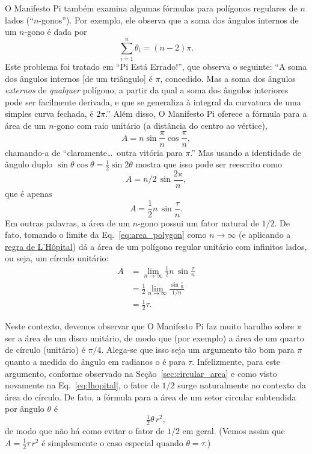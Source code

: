 O Manifesto Pi também examina algumas fórmulas para polígonos regulares de $n$ lados (``$n$-gonos''). Por exemplo, ele observa que a soma dos ângulos internos de um $n$-gono é dada por
\[
\sum_{i=1}^n \theta_i=(n-2)\pi.
\]
Este problema foi tratado em ``Pi Está Errado!'', que observa o seguinte: ``A soma dos ângulos internos [de um triângulo] é $\pi$, concedido. Mas a soma dos ângulos \emph{externos} de \emph{qualquer} polígono, a partir da qual a soma dos ângulos interiores pode ser facilmente derivada, e que se generaliza à integral da curvatura de uma simples curva fechada, é $2\pi$.'' Além disso, O Manifesto Pi oferece a fórmula para a área de um $n$-gono com raio unitário (a distância do centro ao vértice),
\[ A=n\sin\frac{\pi}{n}\cos\frac{\pi}{n}, \]
chamando-a de ``claramente\ldots\ outra vitória para $\pi$.'' Mas usando a identidade de ângulo duplo $\sin\theta\cos\theta = \frac{1}{2} \sin 2\theta$ mostra que isso pode ser reescrito como
\[ A = n/2\, \sin\frac{2\pi}{n}, \]
que é apenas
\begin{equation}
\label{eq:area_polygon}
A = \frac{1}{2} n\, \sin\frac{\tau}{n}.
\end{equation}
Em outras palavras, a área de um $n$-gono possui um fator natural de $1/2$. De fato, tomando o limite da Eq.~\eqref{eq:area_polygon} como $n\rightarrow \infty$ (e aplicando a \href{https://mathworld.wolfram.com/LHospitalsRule.html}{regra de L'H\^{o}pital}) dá a área de um polígono regular unitário com infinitos lados, ou seja, um círculo unitário:
\begin{equation}
\label{eq:lhopital}
\begin{split}
A & = \lim_{n\rightarrow\infty} \frac{1}{2} n\, \sin\frac{\tau}{n} \\
  & = \frac{1}{2} \lim_{n\rightarrow\infty} \frac{\sin\frac{\tau}{n}}{1/n} \\
  & = \tfrac{1}{2}\tau.
\end{split}
\end{equation}

Neste contexto, devemos observar que O Manifesto Pi faz muito barulho sobre $\pi$ ser a área de um disco unitário, de modo que (por exemplo) a área de um quarto de círculo (unitário) é $\pi/4$. Alega-se que isso seja um argumento tão bom para $\pi$ quanto a medida do ângulo em radianos o é para $\tau$. Infelizmente, para este argumento, conforme observado na Seção~\ref{sec:circular_area} e como visto novamente na Eq.~\eqref{eq:lhopital}, o fator de $1/2$ surge naturalmente no contexto da área do círculo. De fato, a fórmula para a área de um setor circular subtendida por ângulo $\theta$ é
\[
\tfrac{1}{2}\theta\, r^2,
\]
de modo que não há como evitar o fator de $1/2$ em geral. (Vemos assim que $A = \frac{1}{2} \tau\, r^2$ é simplesmente o caso especial quando $\theta = \tau$.)

